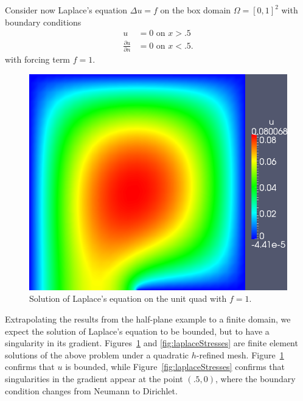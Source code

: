\documentclass[letterpaper]{article}
\newcommand{\del}{\Delta}
\newcommand{\pd}[2]{\frac{\partial#1}{\partial#2}}
\begin{document}
Consider now Laplace's equation $\del u = f$ on the box domain $\Omega =
[0,1]^2$ with boundary conditions
\begin{align*}
u &= 0 \text{ on } x > .5\\
\pd{u}{n} &= 0 \text{ on } x < .5.
\end{align*}
with forcing term $f=1$.  
\begin{figure}[!h]
\centering
\includegraphics[scale=.375]{figs/LaplaceFigs/LaplacePlate.png}
\caption{Solution of Laplace's equation on the unit quad with $f=1$.}
\label{fig:laplace}
\end{figure}
Extrapolating the results from the half-plane example to a finite domain, we
expect the solution of Laplace's equation to be bounded, but to have a
singularity in its gradient.  Figures~\ref{fig:laplace} and
\ref{fig:laplaceStresses} are finite element solutions of the above problem
under a quadratic $h$-refined mesh.  Figure~\ref{fig:laplace} confirms that
$u$ is bounded, while Figure~\ref{fig:laplaceStresses} confirms that
singularities in the gradient appear at the point $(.5,0)$, where the boundary
condition changes from Neumann to Dirichlet.  
\end{document}
